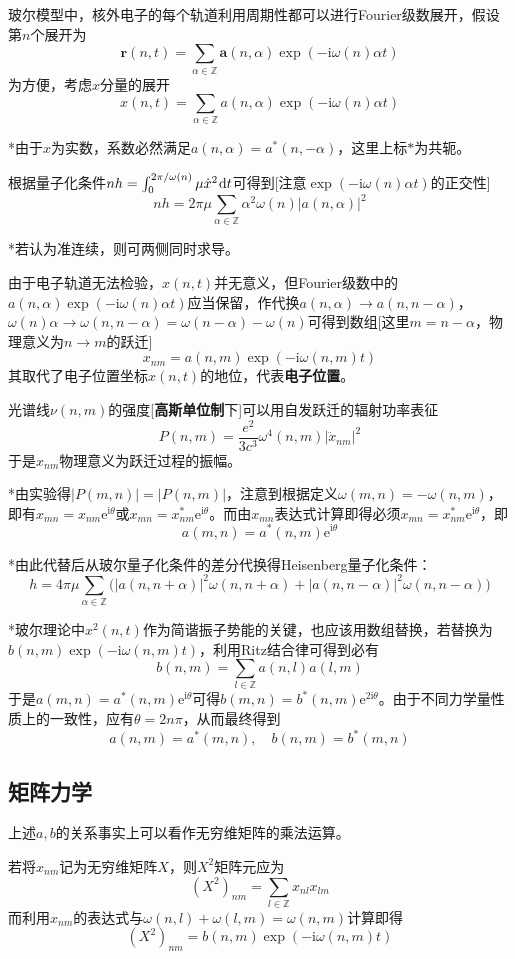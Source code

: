 \documentclass[a4paper,UTF8,fontset=windows]{ctexart}
\newcommand*{\dr}{\hspace{0.07em}\mathrm{d}}
\newcommand*{\ir}{\mathrm{i}}
\newcommand*{\er}{\mathrm{e}}
\begin{document}
玻尔模型中，核外电子的每个轨道利用周期性都可以进行Fourier级数展开，假设第$n$个展开为
$$\mathbf{r}(n,t)=\sum_{\alpha\in\mathbb{Z}}\mathbf{a}(n,\alpha)\exp(-\ir\omega(n)\alpha t)$$
为方便，考虑$x$分量的展开
$$x(n,t)=\sum_{\alpha\in\mathbb{Z}}a(n,\alpha)\exp(-\ir\omega(n)\alpha t)$$

*由于$x$为实数，系数必然满足$a(n,\alpha)=a^*(n,-\alpha)$，这里上标$*$为共轭。

根据量子化条件$nh=\int_0^{2\pi/\omega(n)}\mu\dot{x}^2\dr t$可得到[注意$\exp(-\ir\omega(n)\alpha t)$的正交性]
$$nh=2\pi\mu\sum_{\alpha\in\mathbb{Z}}\alpha^2\omega(n)|a(n,\alpha)|^2$$

*若认为准连续，则可两侧同时求导。

由于电子轨道无法检验，$x(n,t)$并无意义，但Fourier级数中的$a(n,\alpha)\exp(-\ir\omega(n)\alpha t)$应当保留，作代换$a(n,\alpha)\to a(n,n-\alpha)$，$\omega(n)\alpha\to\omega(n,n-\alpha)=\omega(n-\alpha)-\omega(n)$可得到数组[这里$m=n-\alpha$，物理意义为$n\to m$的跃迁]
$$x_{nm}=a(n,m)\exp(-\ir\omega(n,m)t)$$
其取代了电子位置坐标$x(n,t)$的地位，代表\textbf{电子位置}。

光谱线$\nu(n,m)$的强度[\textbf{高斯单位制}下]可以用自发跃迁的辐射功率表征
$$P(n,m)=\frac{e^2}{3c^3}\omega^4(n,m)|\ddot{x}_{nm}|^2$$
于是$x_{nm}$物理意义为跃迁过程的振幅。

*由实验得$|P(m,n)|=|P(n,m)|$，注意到根据定义$\omega(m,n)=-\omega(n,m)$，即有$x_{mn}=x_{nm}\er^{\ir\theta}$或$x_{mn}=x_{nm}^*\er^{\ir\theta}$。而由$x_{mn}$表达式计算即得必须$x_{mn}=x_{nm}^*\er^{\ir\theta}$，即
$$a(m,n)=a^*(n,m)\er^{\ir\theta}$$

*由此代替后从玻尔量子化条件的差分代换得Heisenberg量子化条件：
$$h=4\pi\mu\sum_{\alpha\in\mathbb{Z}}\bigg(|a(n,n+\alpha)|^2\omega(n,n+\alpha)+|a(n,n-\alpha)|^2\omega(n,n-\alpha)\bigg)$$

*玻尔理论中$x^2(n,t)$作为简谐振子势能的关键，也应该用数组替换，若替换为$b(n,m)\exp(-\ir\omega(n,m)t)$，利用Ritz结合律可得到必有
$$b(n,m)=\sum_{l\in\mathbb{Z}}a(n,l)a(l,m)$$
于是$a(m,n)=a^*(n,m)\er^{\ir\theta}$可得$b(m,n)=b^*(n,m)\er^{2\ir\theta}$。由于不同力学量性质上的一致性，应有$\theta=2n\pi$，从而最终得到
$$a(n,m)=a^*(m,n),\quad b(n,m)=b^*(m,n)$$

\subsection{矩阵力学}
上述$a,b$的关系事实上可以看作无穷维矩阵的乘法运算。

若将$x_{nm}$记为无穷维矩阵$X$，则$X^2$矩阵元应为
$$(X^2)_{nm}=\sum_{l\in\mathbb{Z}}x_{nl}x_{lm}$$
而利用$x_{nm}$的表达式与$\omega(n,l)+\omega(l,m)=\omega(n,m)$计算即得
$$(X^2)_{nm}=b(n,m)\exp(-\ir\omega(n,m)t)$$
\end{document}
